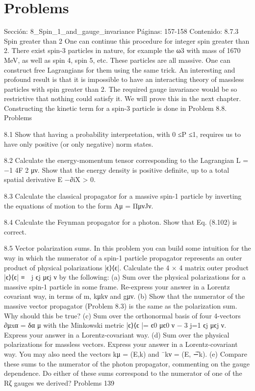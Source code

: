 \section*{Problems}
Sección: 8_Spin_1_and_gauge_invariance
Páginas: 157-158
Contenido:
8.7.3 Spin greater than 2
One can continue this procedure for integer spin greater than 2. There exist spin-3 particles
in nature, for example the ω3 with mass of 1670 MeV, as well as spin 4, spin 5, etc. These
particles are all massive. One can construct free Lagrangians for them using the same trick.
An interesting and profound result is that it is impossible to have an interacting theory of
massless particles with spin greater than 2. The required gauge invariance would be so
restrictive that nothing could satisfy it. We will prove this in the next chapter. Constructing
the kinetic term for a spin-3 particle is done in Problem 8.8.
Problems

8.1 Show that having a probability interpretation, with 0 ≤P ≤1, requires us to have
only positive (or only negative) norm states.

8.2 Calculate the energy-momentum tensor corresponding to the Lagrangian L =
−1
4F 2
μν. Show that the energy density is positive deﬁnite, up to a total spatial
derivative E −∂iX > 0.

8.3 Calculate the classical propagator for a massive spin-1 particle by inverting the
equations of motion to the form Aμ = ΠμνJν.

8.4 Calculate the Feynman propagator for a photon. Show that Eq. (8.102) is correct.

8.5 Vector polarization sums. In this problem you can build some intuition for the way
in which the numerator of a spin-1 particle propagator represents an outer product
of physical polarizations |ϵ⟩⟨ϵ|. Calculate the 4 × 4 matrix outer product |ϵ⟩⟨ϵ| ≡

j ϵj
μϵj
ν by the following:
(a) Sum over the physical polarizations for a massive spin-1 particle in some
frame. Re-express your answer in a Lorentz covariant way, in terms of m, kμkν
and gμν.
(b) Show that the numerator of the massive vector propagator (Problem 8.3) is the
same as the polarization sum. Why should this be true?
(c) Sum over the orthonormal basis of four 4-vectors ∂μxα = δα
μ with the
Minkowski metric |ϵ⟩⟨ϵ |= ϵ0
μϵ0
ν −3
j=1 ϵj
μϵj
ν. Express your answer in a
Lorentz-covariant way.
(d) Sum over the physical polarizations for massless vectors. Express your answer
in a Lorentz-covariant way. You may also need the vectors kμ = (E,⃗k) and
¯kν = (E, −⃗k).
(e) Compare these sums to the numerator of the photon propagator, commenting
on the gauge dependence. Do either of these sums correspond to the numerator
of one of the Rζ gauges we derived?
Problems
139

